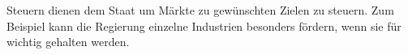 Steuern dienen dem Staat um Märkte zu gewünschten Zielen zu steuern.
Zum Beispiel kann die Regierung einzelne Industrien besonders fördern, wenn sie für wichtig gehalten werden.